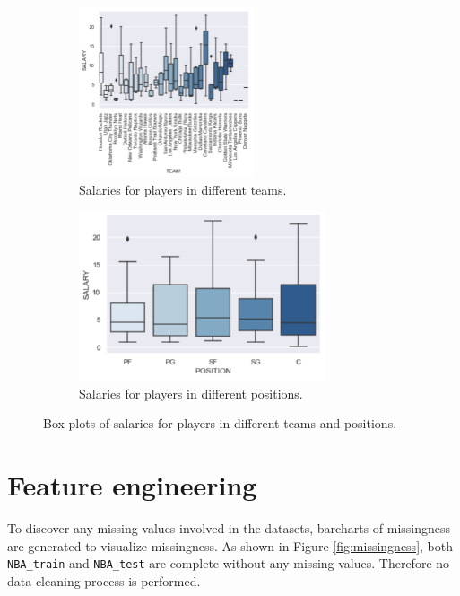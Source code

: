 \documentclass[letterpaper,12pt,twoside,]{pinp}
\begin{document}
\begin{figure}[H]
\begin{subfigure}{0.5\textwidth}
\includegraphics[width=0.9\linewidth, height=5cm]{team_box.png}
\centering
\caption{Salaries for players in different teams.}
\label{fig:subim1}
\end{subfigure}
\begin{subfigure}{0.5\textwidth}
\includegraphics[width=0.9\linewidth, height=5cm]{position_box.png}
\centering
\caption{Salaries for players in different positions.}
\label{fig:subim2}
\end{subfigure}
\caption{Box plots of salaries for players in different teams and positions.}
\end{figure}

\hypertarget{feature-engineering}{%
\section{Feature engineering}\label{feature-engineering}}

To discover any missing values involved in the datasets, barcharts of
missingness are generated to visualize missingness. As shown in Figure
\ref{fig:missingness}, both \texttt{NBA\_train} and \texttt{NBA\_test}
are complete without any missing values. Therefore no data cleaning
process is performed.
\end{document}
